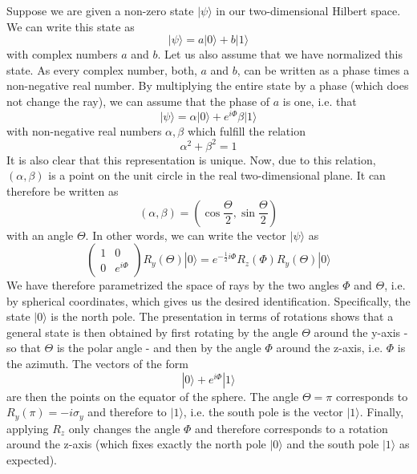 \documentclass[a4paper, draft]{article}
\theoremstyle{own}
\theoremstyle{remark}
\begin{document}
Suppose we are given a non-zero state $|\psi\rangle$ in our two-dimensional Hilbert space. We can write this state as
$$
|\psi \rangle = a |0 \rangle + b |1 \rangle
$$
with complex numbers $a$ and $b$. Let us also assume that we have normalized this state. As every complex number, both, $a$ and $b$, can be written as a phase times a non-negative real number. By multiplying the entire state by a phase (which does not change the ray), we can assume that the phase of $a$ is one, i.e. that
$$
|\psi \rangle = \alpha |0 \rangle + e^{i\Phi} \beta |1 \rangle
$$
with non-negative real numbers $\alpha, \beta$ which fulfill the relation
$$
\alpha^2 + \beta^2 = 1
$$
It is also clear that this representation is unique. Now, due to this relation, $(\alpha, \beta)$ is a point on the unit circle in the real two-dimensional plane. It can therefore be written as
$$
(\alpha, \beta) = (\cos \frac{\Theta}{2}, \sin \frac{\Theta}{2})
$$
with an angle $\Theta$. In other words, we can write the vector $|\psi \rangle$ as
$$
\begin{pmatrix} 1 & 0 \\ 0 & e^{i\Phi} \end{pmatrix} R_y(\Theta) |0 \rangle
=
e^{-\frac{1}{2} i \Phi} R_z(\Phi) R_y(\Theta) |0 \rangle
$$
We have therefore parametrized the space of rays by the two angles $\Phi$ and $\Theta$, i.e. by spherical coordinates, which gives us the desired identification. Specifically, the state $|0 \rangle$ is the north pole. The presentation in terms of rotations shows that a general state is then obtained by first rotating by the angle $\Theta$ around the y-axis - so that $\Theta$ is the polar angle - and then by the angle $\Phi$ around the z-axis, i.e. $\Phi$ is the azimuth. The vectors of the form
$$
|0 \rangle + e^{i\Phi} |1 \rangle
$$
are then the points on the equator of the sphere. The angle $\Theta = \pi$ corresponds to $R_y(\pi) = -i\sigma_y$ and therefore to $|1 \rangle$, i.e. the south pole is the vector $|1 \rangle$. Finally, applying $R_z$ only changes the angle $\Phi$ and therefore corresponds to a rotation around the z-axis (which fixes exactly the north pole $|0 \rangle$ and the south pole $|1 \rangle$ as expected).
\end{document}
